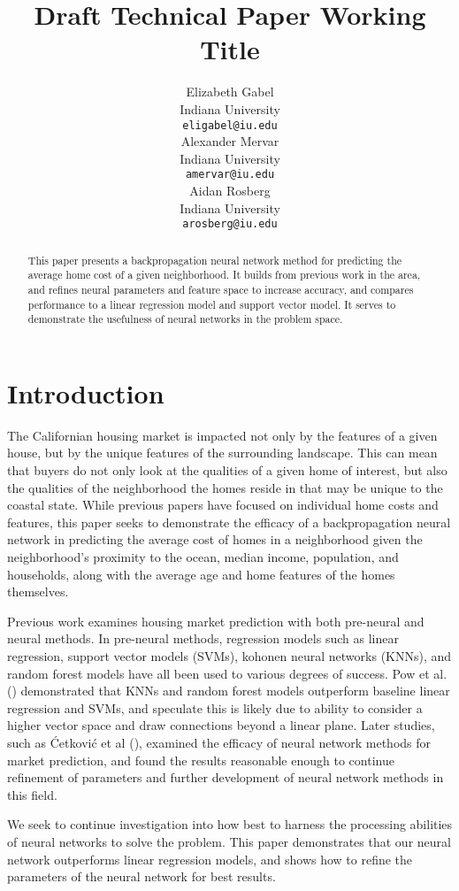 \documentclass[11pt]{article}
\title{Draft Technical Paper Working Title}
\author{Elizabeth Gabel \\
  Indiana University \\
  \texttt{eligabel@iu.edu} \\\And
  Alexander Mervar \\
  Indiana University \\
  \texttt{amervar@iu.edu} \\\And
  Aidan Rosberg \\
  Indiana University \\
  \texttt{arosberg@iu.edu}\\}
\begin{document}
\maketitle
\begin{abstract}
This paper presents a backpropagation neural network method for predicting the average home cost of a given neighborhood.  It builds from previous work in the area, and refines neural parameters and feature space to increase accuracy, and compares performance to a linear regression model and support vector model.  It serves to demonstrate the usefulness of neural networks in the problem space.
\end{abstract}

\section{Introduction}

The Californian housing market is impacted not only by the features of a given house, but by the unique features of the surrounding landscape.  This can mean that buyers do not only look at the qualities of a given home of interest, but also the qualities of  the neighborhood the homes reside in that may be unique to the coastal state.  While previous papers have focused on individual home costs and features, this paper seeks to demonstrate the efficacy of a backpropagation  neural network in predicting the average cost of homes in a neighborhood given the neighborhood’s proximity to the ocean, median income, population, and households, along with the average age and home features of the homes themselves.

Previous work examines housing market prediction with both pre-neural and neural methods.  In pre-neural methods, regression models such as linear regression, support vector models (SVMs), kohonen neural networks (KNNs), and random forest models have all been used to various degrees of success.  Pow et al. (\citeyear{Pow2014}) demonstrated that KNNs and random forest models outperform baseline linear regression and SVMs, and speculate this is likely due to ability to consider a higher vector space and draw connections beyond a linear plane.  Later studies, such as Ćetković et al (\citeyear{Cetkovic2018}), examined the efficacy of neural network methods for market prediction, and found the results reasonable enough to continue refinement of parameters and further development of neural network methods in this field.

We seek to continue investigation into how best to harness the processing abilities of neural networks to solve the problem.  This paper demonstrates that our neural network outperforms linear regression models, and shows how to refine the parameters of the neural network for best results.
\end{document}
